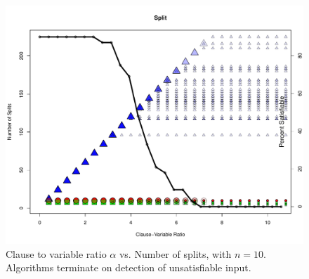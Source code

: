 \begin{figure}[htdp]

\begin{center}

\includegraphics[width=1.1\textwidth]{./figures/metricOutput_n10/splitCount.pdf}

\caption{Clause to variable ratio $\alpha$ vs. Number of splits, with $n = 10$.  Algorithms terminate on detection of unsatisfiable input. }
\label{splitFig_10}
\end{center}
\end{figure}


\FloatBarrier

